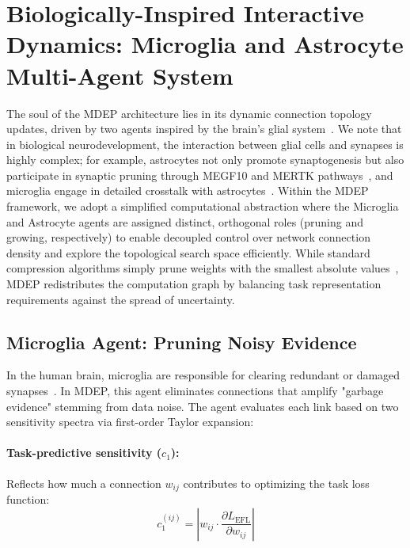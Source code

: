 \documentclass[11pt, a4paper]{article}
\begin{document}
\section{Biologically-Inspired Interactive Dynamics: Microglia and Astrocyte Multi-Agent System}\label{sec:agents}

The soul of the MDEP architecture lies in its dynamic connection topology updates, driven by two agents inspired by the brain's glial system~\cite{paolicelli2011synaptic, schafer2012microglia}. We note that in biological neurodevelopment, the interaction between glial cells and synapses is highly complex; for example, astrocytes not only promote synaptogenesis but also participate in synaptic pruning through MEGF10 and MERTK pathways~\cite{chung2013astrocytes}, and microglia engage in detailed crosstalk with astrocytes~\cite{vainchtein2018astrocyte}. Within the MDEP framework, we adopt a simplified computational abstraction where the Microglia and Astrocyte agents are assigned distinct, orthogonal roles (pruning and growing, respectively) to enable decoupled control over network connection density and explore the topological search space efficiently. While standard compression algorithms simply prune weights with the smallest absolute values~\cite{han2016deep}, MDEP redistributes the computation graph by balancing task representation requirements against the spread of uncertainty.

\subsection{Microglia Agent: Pruning Noisy Evidence}\label{subsec:microglia}

In the human brain, microglia are responsible for clearing redundant or damaged synapses~\cite{paolicelli2011synaptic, schafer2012microglia}. In MDEP, this agent eliminates connections that amplify "garbage evidence" stemming from data noise. The agent evaluates each link based on two sensitivity spectra via first-order Taylor expansion:

\paragraph{Task-predictive sensitivity ($c_1$):}
Reflects how much a connection $w_{ij}$ contributes to optimizing the task loss function:
\begin{equation}
    c_1^{(ij)} = \left| w_{ij} \cdot \frac{\partial L_{\text{EFL}}}{\partial w_{ij}} \right|
\end{equation}
\end{document}
